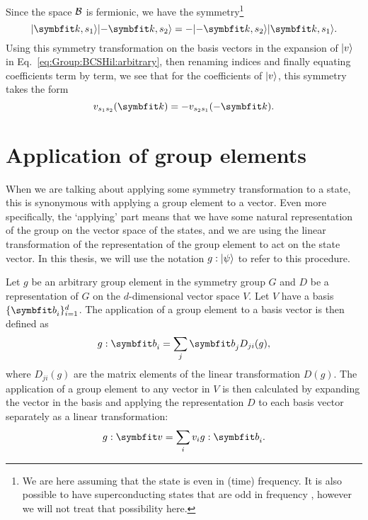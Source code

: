Since the space $\mathcal{B}$ is fermionic, we have the symmetry\footnote{We are here assuming that the state is even in (time) frequency. It is also possible
to have superconducting states that are odd in frequency \cite{Pal17}, however we will not treat that possibility here.}
\begin{equation}
    \label{eq:Group:BCSHil:fermSymm}
    \ket{\v{k},s_1}\ket{-\v{k},s_2} = -\ket{-\v{k},s_2}\ket{\v{k},s_1}.
\end{equation}
Using this symmetry transformation on the basis vectors in the expansion of $\lvert v \rangle$ in Eq.~\eqref{eq:Group:BCSHil:arbitrary}, then renaming indices
and finally equating coefficients term by term, we see that for the coefficients of $\lvert v \rangle$, this symmetry takes the form
\begin{equation}
    \label{eq:GroupBCSHil:fermSymmCoeff}
    v_{s_1s_2}(\v{k}) = -v_{s_2s_1}(-\v{k}).
\end{equation}


\section{Application of group elements}

When we are talking about applying some symmetry transformation to a state, this is synonymous with applying a group element to a vector.
Even more specifically, the `applying' part means that we have some natural representation of the group on the vector space of the 
states, and we are using the linear transformation of the representation of the group element to act on the state vector. In this
thesis, we will use the notation $g:\lvert \psi \rangle$ to refer to this procedure.

Let $g$ be an arbitrary group element in the symmetry group $G$ and $D$ be a representation of $G$ on the $d$-dimensional vector space $V$.
Let $V$ have a basis $\{\v{b}_i\}_{i=1}^d$. The application of a group element to a basis vector is then defined as
\begin{equation}
    \label{eq:Group:Prod:basisApp}
    g:\v{b}_i = \sum_j\v{b}_jD_{ji}(g),
\end{equation}
where $D_{ji}(g)$ are the matrix elements of the linear transformation $D(g)$.
The application of a group element to any vector in $V$ is then calculated by expanding the vector in the basis and applying the representation
$D$ to each basis vector separately as a linear transformation:
\begin{equation}
    \label{eq:Group:App:linearTransformApp}
    g:\v{v} = \sum_iv_ig:\v{b}_i.
\end{equation}

